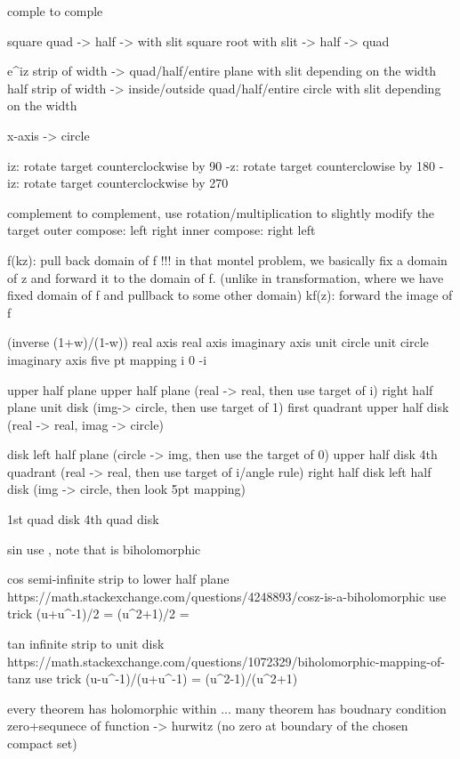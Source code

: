 	comple to comple
		
		
square	quad -> half -> with slit
square root with slit -> half -> quad

e^{iz} strip of width -> quad/half/entire plane with slit depending on the width
		half strip of width -> inside/outside quad/half/entire circle with slit depending on the width
			
		x-axis -> circle

iz: rotate target counterclockwise by 90
-z: rotate target counterclowise by 180
-iz: rotate target counterclockwise by 270

complement to complement, use rotation/multiplication to slightly modify the target
outer compose: left \to right
inner compose: right \to left

f(kz): pull back domain of f
	!!! in that montel problem, we basically fix a domain of z and forward it to the domain of f. (unlike in transformation, where we have fixed domain of f and pullback to some other domain)
kf(z): forward the image of f

						 (inverse (1+w)/(1-w))
real axis				real axis
imaginary axis			unit circle
unit circle				imaginary axis
five pt mapping
		i
	0
		-i

upper half plane		upper half plane (real -> real, then use target of i)
right half plane		unit disk (img-> circle, then use target of 1)
first quadrant 			upper half disk (real -> real, imag -> circle)

disk					left half plane (circle -> img, then use the target of 0)
upper half disk			4th quadrant (real -> real, then use target of i/angle rule)
right half disk			left half disk (img -> circle, then look 5pt mapping)

1st quad disk			4th quad disk


sin						use , note that  is biholomorphic

cos						semi-infinite strip to lower half plane
https://math.stackexchange.com/questions/4248893/cosz-is-a-biholomorphic			
						use trick 
						(u+u^{-1})/2
						= (u^2+1)/2
						= 


tan						infinite strip to unit disk
https://math.stackexchange.com/questions/1072329/biholomorphic-mapping-of-tanz
						use trick
						(u-u^{-1})/(u+u^{-1})
						= (u^2-1)/(u^2+1)


every theorem has holomorphic within ...
many theorem has boudnary condition
zero+sequnece of function -> hurwitz (no zero at boundary of the chosen compact set)

